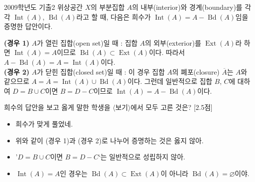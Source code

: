 \documentclass{article}
\begin{document}
\begin{prob}{2009학년도 기출}{2}
  위상공간 $X$의 부분집합 $A$의 내부(interior)와 경계(boundary)를 각각 $\operatorname{Int}(A)$, $\operatorname{Bd}(A)$라고 할 때, 다음은 희수가 $\operatorname{Int}(A)=A-\operatorname{Bd}(A)$임을 증명한 답안이다.
  \begin{hint} %
    \textbf{(경우 1)} $A$가 열린 집합(open set)일 때 : 집합 $A$의 외부(exterior)를 $\operatorname{Ext}(A)$라 하면 $\operatorname{Int}(A)=A$이므로 $\operatorname{Bd}(A)\subset\operatorname{Ext}(A)$이다. 따라서 $A-\operatorname{Bd}(A)=A=\operatorname{Int}(A)$이다. \\
    \textbf{(경우 2)} $A$가 닫힌 집합(closed set)일 때 : 이 경우 집합 $A$의 폐포(closure) $\overline{A}$는 $A$와 같으므로 $A=\overline{A}=\operatorname{Int}(A)\cup\operatorname{Bd}(A)$이다. 그런데 일반적으로 집합 $B$, $C$에 대하여 $D=B\cup C$이면 $B=D-C$이므로 $\operatorname{Int}(A)=A-\operatorname{Bd}(A)$이다.
  \end{hint}
  희수의 답안을 보고 옳게 말한 학생을 $\langle$보기$\rangle$에서 모두 고른 것은? [2.5점]
  \begin{hint}[보기] %
    \begin{itemize}
      \item[(현정)] 희수가 맞게 풀었네.
      \item[(기태)] 위와 같이 (경우 1)과 (경우 2)로 나누어 증명하는 것은 옳지 않아.
      \item[(수연)] '$D=B\cup C$이면 $B=D-C$`는 일반적으로 성립하지 않아.
      \item[(영호)] $\operatorname{Int}(A)=A$인 경우는 $\operatorname{Bd}(A)\subset\operatorname{Ext}(A)$이 아니라 $\operatorname{Bd}(A)=\varnothing$이야.
    \end{itemize}
  \end{hint}
\end{prob}
\end{document}
